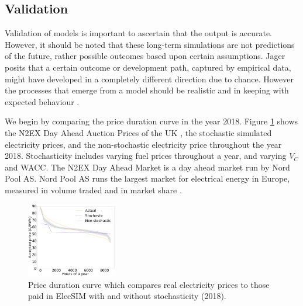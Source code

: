 \subsection{Validation}

 Validation of models is important to ascertain that the output is accurate. However, it should be noted that these long-term simulations are not predictions of the future, rather possible outcomes based upon certain assumptions. Jager posits that a certain outcome or development path, captured by empirical data, might have developed in a completely different direction due to chance. However the processes that emerge from a model should be realistic and in keeping with expected behaviour \cite{Jager2006a}.

We begin by comparing the price duration curve in the year 2018. Figure \ref{fig:price_duration_curve} shows the N2EX Day Ahead Auction Prices of the UK \cite{nordpool_2019}, the stochastic simulated electricity prices, and the non-stochastic electricity price throughout the year 2018. Stochasticity includes varying fuel prices throughout a year, and varying $V_C$ and WACC. The N2EX Day Ahead Market is a day ahead market run by Nord Pool AS. Nord Pool AS runs the largest market for electrical energy in Europe, measured in volume traded and in market share \cite{nordpool_2019}.
\begin{figure}
	\begin{center}
		\includegraphics[width=0.35\textwidth]{figures/load_price_duration_curve_comparison.pdf}
		\caption{Price duration curve which compares real electricity prices to those paid in ElecSIM with and without stochasticity (2018).}
		\label{fig:price_duration_curve}
	\end{center}
\end{figure}



